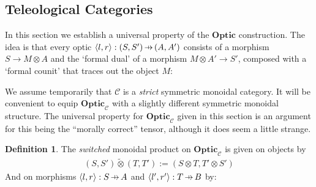 \documentclass[11pt,a4paper]{article}
\theoremstyle{plain}
\theoremstyle{definition}
\newtheorem{definition}[theorem]{Definition}
\newcommand{\C}{\mathscr{C}}
\newcommand{\Optic}{\mathbf{Optic}}
\newcommand{\switched}{\mathbin{\tilde{\otimes}}}
\newcommand{\hto}{\ensuremath{\,\mathaccent\shortmid\rightarrow\,}}
\begin{document}
\subsection{Teleological Categories}
\label{teleological-categories}

In this section we establish a universal property of the $\Optic$ construction. The idea is that every optic $\langle l, r\rangle : (S, S') \hto (A, A')$ consists of a morphism $S \to M \otimes A$ and the `formal dual' of a morphism $M \otimes A' \to S'$, composed with a `formal counit' that traces out the object $M$:
\begin{center}
  
\end{center}

We assume temporarily that $\C$ is a \emph{strict} symmetric monoidal category. It will be convenient to equip $\Optic_\C$ with a slightly different symmetric monoidal structure. The universal property for $\Optic_\C$ given in this section is an argument for this being the ``morally correct'' tensor, although it does seem a little strange.

\begin{definition}
  The \emph{switched} monoidal product on $\Optic_\C$ is given on objects by
  \begin{align*}
    (S, S') \switched (T, T') := (S \otimes T, T' \otimes S')
  \end{align*}
  And on morphisms $\langle l, r \rangle : S \hto A$ and $\langle l', r' \rangle : T \hto B$ by:
  \begin{center}
    
  \end{center}
\end{definition}
\end{document}
